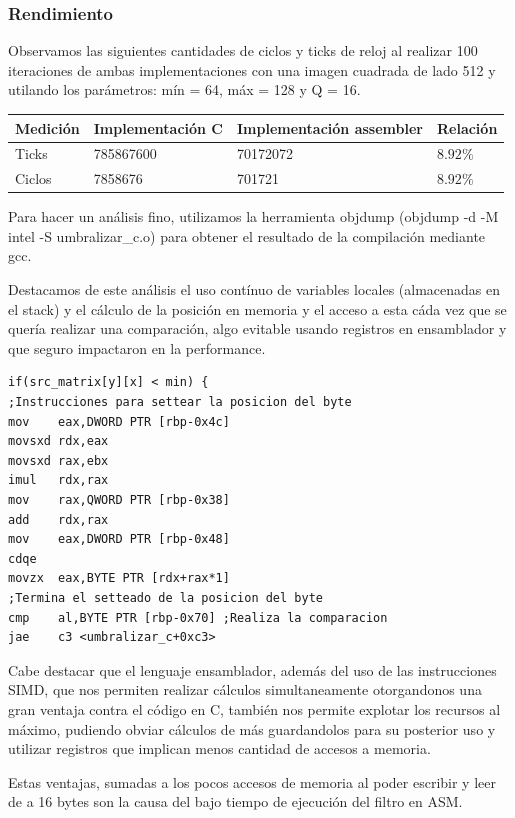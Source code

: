 \subsubsection{Rendimiento}
Observamos las siguientes cantidades de ciclos y ticks de reloj al realizar 100 iteraciones de ambas implementaciones con una imagen cuadrada de lado 512 y utilando los parámetros: mín = 64, máx = 128 y Q = 16.
\begin{center}
    \begin{tabular}{|l|l|l|l|}
        \hline
        Medición & Implementación C & Implementación assembler & Relación \\
        \hline
        Ticks    & 785867600      & 70172072               & $8.92\%$ \\
        Ciclos   & 7858676        & 701721                & $8.92\%$ \\
        \hline
    \end{tabular}
\end{center}

Para hacer un análisis fino, utilizamos la herramienta objdump (objdump -d -M intel -S umbralizar\_c.o) para obtener el resultado de la compilación mediante gcc.

Destacamos de este análisis el uso contínuo de variables locales (almacenadas en el stack) y el cálculo de la posición en memoria y el acceso a esta cáda vez que se quería realizar una comparación, algo evitable usando registros en ensamblador y que seguro impactaron en la performance.

\begin{verbatim}
if(src_matrix[y][x] < min) {
;Instrucciones para settear la posicion del byte
mov    eax,DWORD PTR [rbp-0x4c]
movsxd rdx,eax
movsxd rax,ebx
imul   rdx,rax
mov    rax,QWORD PTR [rbp-0x38]
add    rdx,rax
mov    eax,DWORD PTR [rbp-0x48]
cdqe   
movzx  eax,BYTE PTR [rdx+rax*1]
;Termina el setteado de la posicion del byte
cmp    al,BYTE PTR [rbp-0x70] ;Realiza la comparacion
jae    c3 <umbralizar_c+0xc3>
\end{verbatim}

Cabe destacar que el lenguaje ensamblador, además del uso de las instrucciones SIMD, que nos permiten realizar cálculos simultaneamente otorgandonos una gran ventaja contra el código en C, también nos permite explotar los recursos al máximo, pudiendo obviar cálculos de más guardandolos para su posterior uso y utilizar registros que implican menos cantidad de accesos a memoria.

Estas ventajas, sumadas a los pocos accesos de memoria al poder escribir y leer de a 16 bytes son la causa del bajo tiempo de ejecución del filtro en ASM.